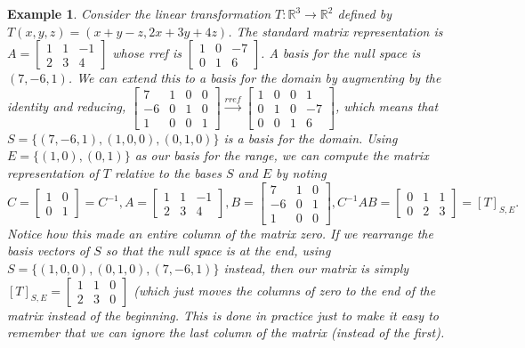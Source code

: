 \documentclass[10pt]{article}
\theoremstyle{plain}
\theoremstyle{box}
\newtheorem{example}{Example}
\begin{document}
\begin{example}
Consider the linear transformation $T:{\mathbb{R}}^3\to {\mathbb{R}}^2$ defined by $T(x,y,z)=(x+y-z,2x+3y+4z)$. The standard matrix representation is 
$
A=
\begin{bmatrix}
 1 & 1 & -1 \\
 2 & 3 & 4
\end{bmatrix}
$
whose rref is
$
\begin{bmatrix}
 1 & 0 & -7 \\
 0 & 1 & 6
\end{bmatrix}
$. A basis for the null space is $(7,-6,1)$. We can extend this to a basis for the domain by augmenting by the identity and reducing, 
$
\begin{bmatrix}
 7 & 1 & 0 & 0 \\
 -6 & 0 & 1 & 0 \\
 1 & 0 & 0 & 1
\end{bmatrix}
\xrightarrow{rref}
\begin{bmatrix}
 1 & 0 & 0 & 1 \\
 0 & 1 & 0 & -7 \\
 0 & 0 & 1 & 6
\end{bmatrix}
$, which means that $S=\{(7,-6,1),(1,0,0),(0,1,0)\}$ is a basis for the domain. Using $E=\{(1,0),(0,1)\}$ as our basis for the range, we can compute the matrix representation of $T$ relative to the bases $S$ and $E$ by noting 
$$C=
\begin{bmatrix}
1 & 0\\
0 & 1
\end{bmatrix}=C^{-1},
A=
\begin{bmatrix}
 1 & 1 & -1 \\
 2 & 3 & 4
\end{bmatrix}, 
B=
\begin{bmatrix}
 7 & 1 & 0 \\
 -6 & 0 & 1 \\
 1 & 0 & 0
\end{bmatrix},
C^{-1}AB= 
\begin{bmatrix}
 0 & 1 & 1 \\
 0 & 2 & 3
\end{bmatrix} = [T]_{S,E}.$$ Notice how this made an entire column of the matrix zero. If we rearrange the basis vectors of $S$ so that the null space is at the end, using $S=\{(1,0,0),(0,1,0),(7,-6,1)\}$ instead, then our matrix is simply $[T]_{S,E} = \begin{bmatrix}
 1 & 1 &0\\
 2 & 3 &0
\end{bmatrix}$ (which just moves the columns of zero to the end of the matrix instead of the beginning.  This is done in practice just to make it easy to remember that we can ignore the last column of the matrix (instead of the first).

\end{example}
\end{document}
